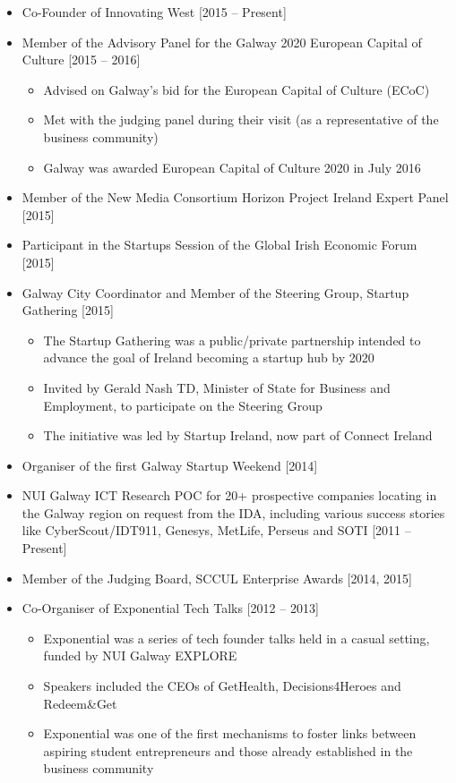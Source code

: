 \documentclass[10pt,a4paper]{res} %
\begin{document}
\begin{resume}
\begin{itemize}
\item Co-Founder of Innovating West [2015 -- Present]
\item Member of the Advisory Panel for the Galway 2020 European Capital of Culture [2015 -- 2016]
\begin{itemize} \itemsep -2pt
\item Advised on Galway's bid for the European Capital of Culture (ECoC)
\item Met with the judging panel during their visit (as a representative of the business community)
\item Galway was awarded European Capital of Culture 2020 in July 2016
\end{itemize}
\item Member of the New Media Consortium Horizon Project Ireland Expert Panel [2015]
\item Participant in the Startups Session of the Global Irish Economic Forum [2015]
\item Galway City Coordinator and Member of the Steering Group, Startup Gathering [2015]
\begin{itemize} \itemsep -2pt
\item The Startup Gathering was a public/private partnership intended to advance the goal of Ireland becoming a startup hub by 2020
\item Invited by Gerald Nash TD, Minister of State for Business and Employment, to participate on the Steering Group
\item The initiative was led by Startup Ireland, now part of Connect Ireland
\end{itemize}
\item Organiser of the first Galway Startup Weekend [2014]
\item NUI Galway ICT Research POC for 20+ prospective companies locating in the Galway region on request from the IDA, including various success stories like CyberScout/IDT911, Genesys, MetLife, Perseus and SOTI [2011 -- Present]
\item Member of the Judging Board, SCCUL Enterprise Awards [2014, 2015]
\item Co-Organiser of Exponential Tech Talks [2012 -- 2013]
\begin{itemize} \itemsep -2pt
\item Exponential was a series of tech founder talks held in a casual setting, funded by NUI Galway EXPLORE
\item Speakers included the CEOs of GetHealth, Decisions4Heroes and Redeem\&Get
\item Exponential was one of the first mechanisms to foster links between aspiring student entrepreneurs and those already established in the business community

\end{itemize}
\end{itemize}
\end{resume}
\end{document}

